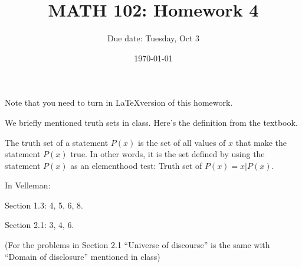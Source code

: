 \documentclass[12pt]{amsart}
\title{ MATH 102: Homework 4}
\author{Due date: Tuesday, Oct 3}
\date{\today}
\begin{document}
\maketitle

Note that you need to turn in \LaTeX version of this homework.

We briefly mentioned truth sets in class.
Here's the definition from the textbook.
\begin{definition}
    The truth set of a statement $P(x)$ is the set of all values of $x$
that make the statement $P(x)$ true. In other words, it is the set defined by using
the statement $P(x)$ as an elementhood test:
Truth set of $P(x) = {x | P(x)}$.
\end{definition}

In Velleman:

Section 1.3: 4, 5, 6, 8.

Section 2.1: 3, 4, 6.

(For the problems in Section 2.1 ``Universe of discourse'' is the same with ``Domain of disclosure'' mentioned in class)







\printbibliography 
%
%
\end{document}
